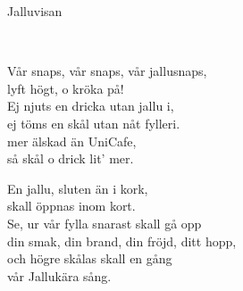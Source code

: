 \begin{song}{Jalluvisan}

	\\
	
	
	Vår snaps, vår snaps, vår jallusnaps,\\
	lyft högt, o kröka på!\\
	Ej njuts en dricka utan jallu i,\\
	ej töms en skål utan nåt fylleri.\\
	mer älskad än UniCafe,\\
	så skål o drick lit’ mer.

	En jallu, sluten än i kork,\\
	skall öppnas inom kort.\\
	Se, ur vår fylla snarast skall gå opp\\
	din smak, din brand, din fröjd, ditt hopp,\\
	och högre skålas skall en gång\\
	vår Jallukära sång.
	
\end{song}
